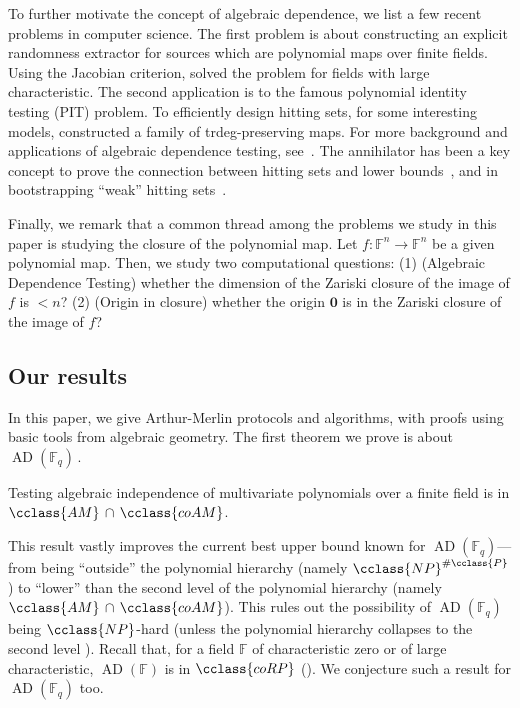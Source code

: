\documentclass{toc}
\newcommand{\F}{\mathbb{F}}
\newcommand{\Pclass}{\cclass{P}\xspace}  %
\newcommand{\NP}{\cclass{NP}\xspace}  %
\newcommand{\coRP}{\cclass{coRP}\xspace}  %
\newcommand{\AM}{\cclass{AM}\xspace}  %
\newcommand{\coAM}{\cclass{coAM}\xspace}  %
\newcommand{\AMcapcoAM}{\AM\,\cap\,\coAM}  %
\DeclareMathOperator{\AD}{\mathrm{AD}\xspace} %
\begin{document}
\smallskip 
To further motivate the concept of algebraic dependence, we list a few recent problems in computer science.
 The first problem is about constructing an explicit randomness extractor for sources which are polynomial maps over finite fields. Using the Jacobian criterion, \cite{DGW09, bib:Dvi09} solved the problem for fields with large characteristic.
 The second application is
%
to   %
the famous polynomial identity testing (PIT) problem. To efficiently design hitting sets, for some interesting models, 
 \cite{BMS13, ASSS11, KS15} constructed a family of trdeg-preserving maps. For more background and applications of algebraic dependence testing, see~\cite{pandey2016algebraic}. The annihilator has been a key concept to prove the connection between hitting sets and lower bounds~\cite{heintz1980testing}, and in  bootstrapping ``weak'' hitting sets~\cite{AGS17}. 

Finally, we remark that a common thread among the problems we study in this paper is studying the closure of the polynomial map.
Let $f:\F^n \to \F^n$ be a given polynomial map. Then, we study two computational questions: (1) (Algebraic Dependence Testing) whether 
the %
dimension of 
%
the Zariski closure of the image of $f$  %
is $< n$? (2) (Origin in closure) whether 
%
the origin $\mathbf{0}$ is in the Zariski closure of the image of $f$? %

%
\subsection{Our results}\label{contrib}
%

In this paper, we give Arthur-Merlin protocols
%
and   %
algorithms, with proofs using basic tools from algebraic geometry. The first theorem we prove is about
%
$\AD(\F_q)$\,.   %

\begin{theorem}\label{thm_amcoam}
%
%
%
Testing algebraic independence of multivariate polynomials over a
finite field is in
%
$\AMcapcoAM$.
%
%
\end{theorem}
 
This result vastly improves the current best upper bound known
for
%
$\AD(\F_q)$---from  %
being ``outside'' the polynomial hierarchy (namely
%
$\NP^{\#\Pclass}$   %
\cite{mittmann2014algebraic}) to ``lower'' than the
%
second level   %
of
the  %
polynomial hierarchy (namely
%
$\AMcapcoAM$).    %
This rules out the possibility
%
of $\AD(\F_q)$   %
being $\NP$-hard (unless
the  %
polynomial hierarchy collapses to the
%
second level   %
\cite{AB09}).  %
Recall that,
%
for a field $\F$ of characteristic zero or of large characteristic,  %
%
$\AD(\F)$   %
is in
%
$\coRP$  %
(). We conjecture such a result for
%
$\AD(\F_q)$    %
too.
\end{document}
